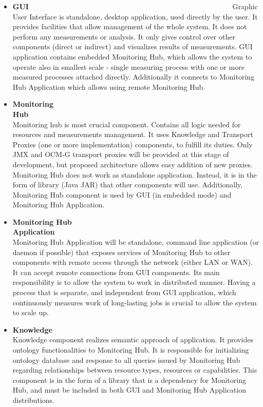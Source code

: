 \begin{itemize}

\item {\bf GUI}~~~~~~~~~~~~~~~~~~~~~~~~~~~~~~~~~~~~~~~~~~~~~~~~~~~~~~~~\linebreak
Graphic User Interface is standalone, desktop application, used directly by the user. It provides facilities that allow management of the whole system. It does not perform any measurements or analysis. It only gives control over other components (direct or indirect) and visualizes results of measurements.
GUI application contains embedded Monitoring Hub, which allows the system to operate also in smallest scale - single measuring process with one or more measured processes attached directly. Additionally it connects to Monitoring Hub Application which allows using remote Monitoring Hub.

\item {\bf Monitoring Hub}~~~~~~~~~~~~~~~~~~~~~~~~~~~~~~~~~~~~~~~~~~~~~~~~~~~~~~~~\linebreak
Monitoring hub is most crucial component. Contains all logic needed for resources and measurements management. It uses Knowledge and Transport Proxies (one or more implementation) components, to fulfill its duties. Only JMX and OCM-G transport proxies will be provided at this stage of development, but proposed architecture allows easy addition of new proxies.
Monitoring Hub does not work as standalone application. Instead, it is in the form of library (Java JAR) that other components will use. Additionally, Monitoring Hub component is used by GUI (in embedded mode) and Monitoring Hub Application.

\item {\bf Monitoring Hub Application}~~~~~~~~~~~~~~~~~~~~~~~~~~~~~~~~~~~~~~~~~~~~~~~~~~~~~~~~\linebreak
Monitoring Hub Application will be standalone, command line application (or daemon if possible) that exposes services of Monitoring Hub to other components with remote access through the network (either LAN or WAN). It can accept remote connections from GUI components.
Its main responsibility is to allow the system to work in distributed manner. Having a process that is separate, and independent from GUI application, which continuously measures work of long-lasting jobs is crucial to allow the system to scale up.


\item {\bf Knowledge}~~~~~~~~~~~~~~~~~~~~~~~~~~~~~~~~~~~~~~~~~~~~~~~~~~~~~~~~\linebreak
Knowledge component realizes semantic approach of application. It provides ontology functionalities to Monitoring Hub. It is responsible for initializing ontology database and response to all queries issued by Monitoring Hub regarding relationships between resource types, resources or capabilities. This component is in the form of a library that is a dependency for Monitoring Hub, and must be included in both GUI and Monitoring Hub Application distributions.


\end{itemize}
